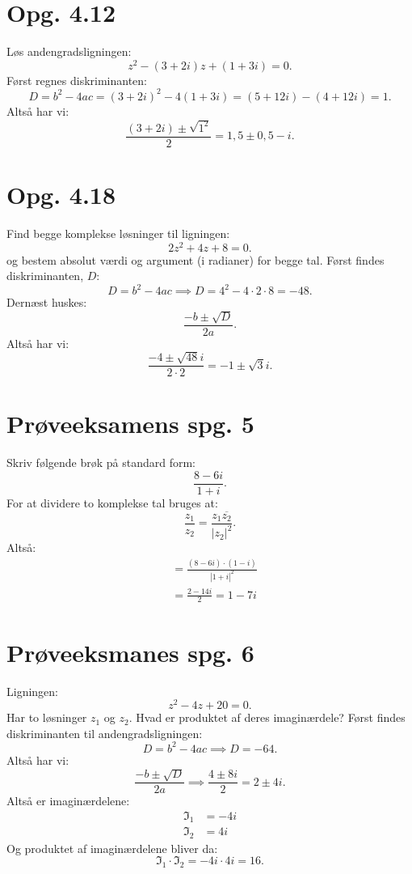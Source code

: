 \documentclass[12pt]{article}
\begin{document}
  \section*{Opg. 4.12}
  Løs andengradsligningen:
  \[
  z^2 - \left( 3+2i \right)z + \left( 1+3i \right) = 0  
  .\] 
  \bigbreak
  Først regnes diskriminanten:
  \[
  D = b^2-4ac = \left( 3+2i \right)^2 - 4\left( 1 + 3i \right)  = \left( 5 + 12i \right) - \left( 4 + 12i \right) = 1
  .\]
  Altså har vi:
  \[
  \frac{\left( 3+2i \right) \pm \sqrt{1^2}}{2} = 1,5 \pm 0,5 - i 
  .\]

  \section*{Opg. 4.18}
  Find begge komplekse løsninger til ligningen:
  \[
  2z^2+4z+8=0
  .\] 
  og bestem absolut værdi og argument (i radianer) for begge tal.
  \bigbreak
  Først findes diskriminanten, $D$:
  \[
  D = b^2-4ac \implies D = 4^2-4\cdot 2\cdot 8 = -48
  .\]
  Dernæst huskes:
  \[
  \frac{-b \pm \sqrt{D}}{2a}
  .\] 
  Altså har vi:
  \[
  \frac{-4 \pm \sqrt{48}i}{2 \cdot 2} = -1 \pm \sqrt{3}i
  .\] 
  
  \section*{Prøveeksamens spg. 5}
  Skriv følgende brøk på standard form:
  \[
  \frac{8-6i}{1+i}
  .\]
  \bigbreak
  For at dividere to komplekse tal bruges at:
  \[
  \frac{z_1}{z_2} = \frac{z_1\overline{z_2}}{|z_2|^2}
  .\] 
  Altså:
  \begin{align*}
  &= \frac{\left( 8-6i \right)\cdot \left( 1-i \right)}{|1+i|^2} \\
  &= \frac{2-14i}{2} = 1-7i
  \end{align*}
  


  \section*{Prøveeksmanes spg. 6}
  Ligningen:
  \[
  z^2-4z+20=0
  .\] 
  Har to løsninger $z_1$ og  $z_2$. Hvad er produktet af deres imaginærdele?
  \bigbreak
  Først findes diskriminanten til andengradsligningen:
  \[
  D = b^2 - 4ac \implies D = -64
  .\] 
  Altså har vi:
  \[
  \frac{-b \pm \sqrt{D}}{2a} \implies \frac{4 \pm 8i}{2} = 2 \pm 4i
  .\]
  Altså er imaginærdelene:
  \begin{align*}
    \Im_1 &= -4i \\
    \Im_2 &= 4i
  \end{align*}
  Og produktet af imaginærdelene bliver da:
  \[
  \Im_1\cdot \Im_2 = -4i\cdot 4i = 16
  .\] 
  
    

 
\end{document}
